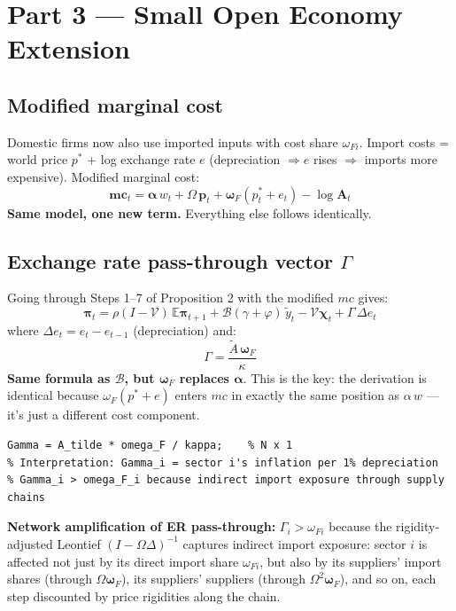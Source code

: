\documentclass[11pt]{article}
\begin{document}
\section{Part 3 — Small Open Economy Extension}

\subsection{Modified marginal cost}

Domestic firms now also use imported inputs with cost share $\omega_{Fi}$.
Import costs = world price $p^*$ + log exchange rate $e$ (depreciation $\Rightarrow e$ rises
$\Rightarrow$ imports more expensive). Modified marginal cost:
\[
  \boldsymbol{mc}_t = \boldsymbol\alpha\,w_t + \Omega\,\mathbf{p}_t
    + \boldsymbol\omega_F(p^*_t + e_t) - \log\mathbf{A}_t
\]
\textbf{Same model, one new term.} Everything else follows identically.

\subsection{Exchange rate pass-through vector $\Gamma$}

Going through Steps 1--7 of Proposition 2 with the modified $mc$ gives:
\[
  \boxed{\boldsymbol\pi_t = \rho(I-\mathcal{V})\,\mathbb{E}\boldsymbol\pi_{t+1}
    + \mathcal{B}(\gamma+\varphi)\,\tilde{y}_t - \mathcal{V}\boldsymbol\chi_t
    + \Gamma\,\Delta e_t}
\]
where $\Delta e_t = e_t - e_{t-1}$ (depreciation) and:
\[
  \Gamma = \frac{\widetilde{A}\,\boldsymbol\omega_F}{\kappa}
\]
\textbf{Same formula as $\mathcal{B}$, but $\boldsymbol\omega_F$ replaces $\boldsymbol\alpha$}.
This is the key: the derivation is identical because $\omega_F(p^*+e)$ enters $mc$
in exactly the same position as $\alpha\,w$ — it's just a different cost component.

\begin{lstlisting}[caption={Matlab: ER pass-through vector (SOE extension)}]
Gamma = A_tilde * omega_F / kappa;    % N x 1
% Interpretation: Gamma_i = sector i's inflation per 1% depreciation
% Gamma_i > omega_F_i because indirect import exposure through supply chains
\end{lstlisting}

\begin{insight}
\textbf{Network amplification of ER pass-through:}
$\Gamma_i > \omega_{Fi}$ because the rigidity-adjusted Leontief
$(I-\Omega\Delta)^{-1}$ captures indirect import exposure:
sector $i$ is affected not just by its direct import share $\omega_{Fi}$,
but also by its suppliers' import shares (through $\Omega\boldsymbol\omega_F$),
its suppliers' suppliers (through $\Omega^2\boldsymbol\omega_F$), and so on,
each step discounted by price rigidities along the chain.
\end{insight}
\end{document}
